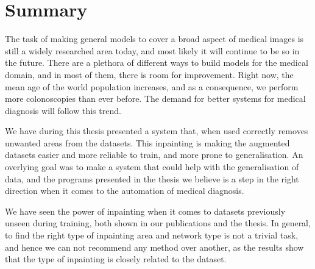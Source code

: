 \section{Summary}
The task of making general models to cover a broad aspect of medical images is still a widely researched area today, and most likely it will continue to be so in the future. There are a  plethora of different ways to build models for the medical domain, and in most of them, there is room for improvement. Right now, the mean age of the world population increases, and as a consequence, we perform more colonoscopies than ever before. The demand for better systems for medical diagnosis will follow this trend.

We have during this thesis presented a system that, when used correctly removes unwanted areas from the datasets. This inpainting is making the augmented datasets easier and more reliable to train, and more prone to generalisation.
An overlying goal was to make a system that could help with the generalisation of data, and the programs presented in the thesis we believe is a step in the right direction when it comes to the automation of medical diagnosis.

We have seen the power of inpainting when it comes to datasets previously unseen during training, both shown in our publications and the thesis.
In general, to find the right type of inpainting area and network type is not a trivial task, and hence we can not recommend any method over another, as the results show that the type of inpainting is closely related to the dataset.
 



